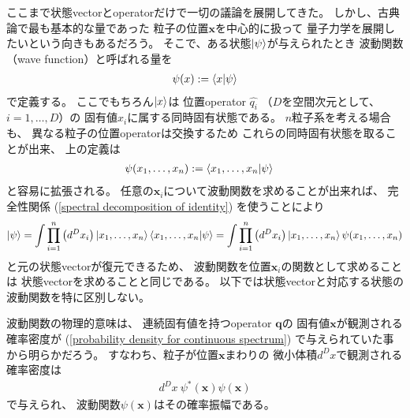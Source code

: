 ここまで状態vectorとoperatorだけで一切の議論を展開してきた。
しかし、古典論で最も基本的な量であった
粒子の位置$\bm{x}$を中心的に扱って
量子力学を展開したいという向きもあるだろう。
そこで、ある状態$\ket{ \psi }$が与えられたとき
波動関数（wave function）と呼ばれる量を
\begin{align}
    \psi(x) := \braket{ x | \psi }
\end{align}
で定義する。
ここでもちろん$\ket{ x }$は
位置operator $\hat{ q_i }$
（$D$を空間次元として、$i = 1,\dots,D$）の
固有値$x_i$に属する同時固有状態である。
$n$粒子系を考える場合も、
異なる粒子の位置operatorは交換するため
これらの同時固有状態を取ることが出来、
上の定義は
\begin{align}
    \psi(x_1, \dots, x_n)
    &:=
    \braket{ x_1, \dots, x_n | \psi }
\end{align}
と容易に拡張される。
任意の$\bm{x}_i$について波動関数を求めることが出来れば、
完全性関係
(\ref{spectral decomposition of identity})
を使うことにより
\begin{align}
    \ket{ \psi }
    =
    \int \prod_{i = 1}^n
    \left(
        d^D x_i
    \right)
    \ket{ x_1, \dots, x_n }
    \braket{ x_1, \dots, x_n | \psi }
    =
    \int \prod_{i = 1}^n
    \left(
        d^D x_i
    \right)
    \ket{ x_1, \dots, x_n }
    \psi( x_1, \dots, x_n )
\end{align}
と元の状態vectorが復元できるため、
波動関数を位置$\bm{x}_i$の関数として求めることは
状態vectorを求めることと同じである。
以下では状態vectorと対応する状態の波動関数を特に区別しない。

波動関数の物理的意味は、
連続固有値を持つoperator $\bm{q}$の
固有値$\bm{x}$が観測される確率密度が
(\ref{probability density for continuous spectrum})
で与えられていた事から明らかだろう。
すなわち、粒子が位置$\bm{x}$まわりの
微小体積$d^D x$で観測される確率密度は
\begin{align}
    d^D x\ 
    \psi^*(\bm{x}) \psi(\bm{x})
\end{align}
で与えられ、
波動関数$\psi(\bm{x})$はその確率振幅である。

